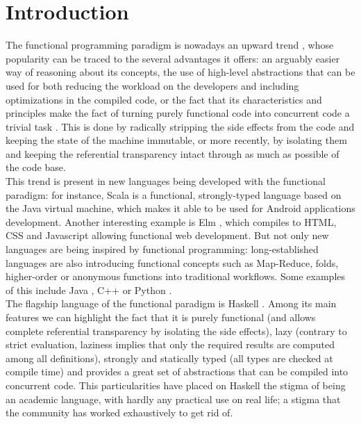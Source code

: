 \section{Introduction}

The functional programming paradigm is nowadays an upward trend
\cite{ford-2013-ibm}, whose popularity can be traced to the several advantages
it offers: an arguably easier way of reasoning about its concepts, the use of
high-level abstractions that can be used for both reducing the workload on the
developers and including optimizations in the compiled code, or the fact that
its characteristics and principles make the fact of turning purely functional
code into concurrent code a trivial task \cite{hammond-2012-parallel}. This is
done by radically stripping the side effects from the code and keeping the
state of the machine immutable, or more recently, by isolating them and keeping
the referential transparency intact through as much as possible of the code base.\\

This trend is present in new languages being developed with the functional
paradigm: for instance, Scala \cite{scala} is a functional, strongly-typed
language based on the Java virtual machine, which makes it able to be used for
Android applications development. Another interesting example is Elm
\cite{elm}, which compiles to HTML, CSS and Javascript allowing functional web
development. But not only new languages are being inspired by functional
programming: long-established languages are also introducing functional
concepts such as Map-Reduce, folds, higher-order or anonymous functions into
traditional workflows. Some examples of this include Java \cite{java8},
C++ \cite{cpp-lambdas, cpp-high-level} or Python \cite{python-mrs}.\\

The flagship language of the functional paradigm is Haskell \cite{haskell-98}.
Among its main features we can highlight the fact that it is purely functional
(and allows complete referential transparency by isolating the side effects),
lazy (contrary to strict evaluation, laziness implies that only the required
results are computed among all definitions), strongly and statically typed (all
types are checked at compile time) and provides a great set of abstractions
that can be compiled into concurrent code. This particularities have placed on
Haskell the stigma of being an academic language, with hardly any practical use
on real life; a stigma that the community has worked exhaustively to get rid
of.\\

